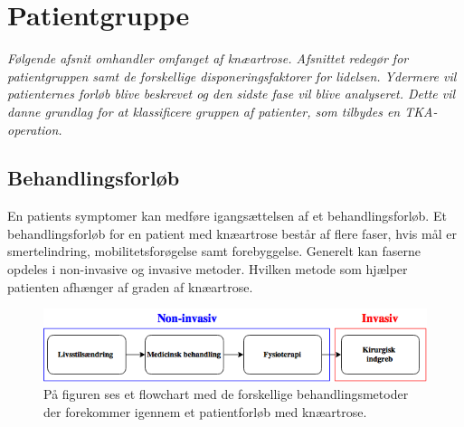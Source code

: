 \section{Patientgruppe}
\textit{Følgende afsnit omhandler omfanget af knæartrose. Afsnittet redegør for patientgruppen samt de forskellige disponeringsfaktorer for lidelsen. Ydermere vil patienternes forløb blive beskrevet og den sidste fase vil blive analyseret. Dette vil danne grundlag for at klassificere gruppen af patienter, som tilbydes en TKA-operation.}

\subsection{Behandlingsforløb}
En patients symptomer kan medføre igangsættelsen af et behandlingsforløb. Et behandlingsforløb for en patient med knæartrose består af flere faser, hvis mål er smertelindring, mobilitetsforøgelse samt forebyggelse. Generelt kan faserne opdeles i non-invasive og invasive metoder. Hvilken metode som hjælper patienten afhænger af graden af knæartrose.

\begin{figure}[H]
	\centering
	\includegraphics[width=1\textwidth]{figures/bProblemanalyse/flowchart_behandlingsforloeb.png}
	\caption{På figuren ses et flowchart med de forskellige behandlingsmetoder der forekommer igennem et patientforløb med knæartrose.}
	\label{fig:flow_behandlingsfaser}
\end{figure}\vspace{-.25cm}

